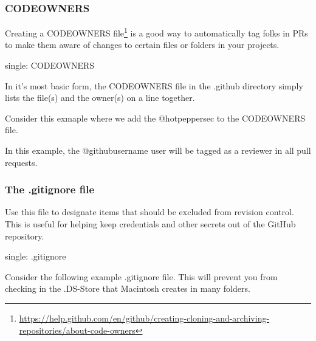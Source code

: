 \hypertarget{codeowners}{%
\subsubsection{CODEOWNERS}\label{codeowners}}

Creating a CODEOWNERS file\footnote{\url{https://help.github.com/en/github/creating-cloning-and-archiving-repositories/about-code-owners}}
is a good way to automatically tag folks in PRs to make them aware of
changes to certain files or folders in your projects.

single: CODEOWNERS

In it's most basic form, the CODEOWNERS file in the .github directory
simply lists the file(s) and the owner(s) on a line together.

Consider this exmaple where we add the @hotpeppersec to the CODEOWNERS
file.

\begin{Shaded}
\begin{Highlighting}[]
\NormalTok{:/home/secdevops# if [ ! -d }\NormalTok{ ]}\KeywordTok{;}  \KeywordTok{;} 
 \OperatorTok{>>}
\end{Highlighting}
\end{Shaded}

In this example, the @githubusername user will be tagged as a reviewer
in all pull requests.

\hypertarget{the-.gitignore-file}{%
\subsubsection{The .gitignore file}\label{the-.gitignore-file}}

Use this file to designate items that should be excluded from revision
control. This is useful for helping keep credentials and other secrets
out of the GitHub repository.

single: .gitignore

Consider the following example .gitignore file. This will prevent you
from checking in the .DS-Store that Macintosh creates in many folders.

\begin{Shaded}
\begin{Highlighting}[]
 \OperatorTok{>}
\end{Highlighting}
\end{Shaded}

